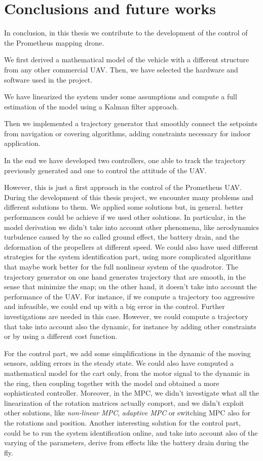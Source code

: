 \chapter{Conclusions and future works}
\label{conclusions}

In conclusion, in this thesis we contribute to the development of the control of the Prometheus mapping drone. 

\noindent We first derived a mathematical model of the vehicle with a different structure from any other commercial UAV. Then, we have selected the hardware and software used in the project. 

\noindent We have linearized the system under some assumptions and compute a full estimation of the model using a Kalman filter approach.

\noindent Then we implemented a trajectory generator that smoothly connect the setpoints from navigation or covering algorithms, adding constraints necessary for indoor application.

\noindent In the end we have developed two controllers, one able to track the trajectory previously generated and one to control the attitude of the UAV.

\noindent However, this is just a first approach in the control of the Prometheus UAV. During the development of this thesis project, we encounter many problems and different solutions to them. We applied some solutions but, in general. better performances could be achieve if we used other solutions. In particular, in the model derivation we didn't take into account other phenomena, like aerodynamics turbulence caused by the so called ground effect, the battery drain, and the deformation of the propellers at different speed. We could also have used different strategies for the system identification part, using more complicated algorithms that maybe work better for the full nonlinear system of the quadrotor. The trajectory generator on one hand generates trajectory that are smooth, in the sense that minimize the snap; on the other hand, it doesn't take into account the performance of the UAV. For instance, if we compute a trajectory too aggressive and infeasible, we could end up with a big error in the control. Further investigations are needed in this case. However, we could compute a trajectory that take into account also the dynamic, for instance by adding other constraints or by using a different cost function. 

\noindent For the control part, we add some simplifications in the dynamic of the moving sensors, adding errors in the steady state. We could also have computed a mathematical model for the cart only, from the motor signal to the dynamic in the ring, then coupling together with the model and obtained a more sophisticated controller. Moreover, in the MPC, we didn't investigate what all the linearization of the rotation matrices actually comport, and we didn't exploit other solutions, like \textit{non-linear MPC}, \textit{adaptive MPC} or switching MPC also for the rotations and position. Another interesting solution for the control part, could be to run the system identification online, and take into account also of the varying of the parameters, derive from effects like the battery drain during the fly.